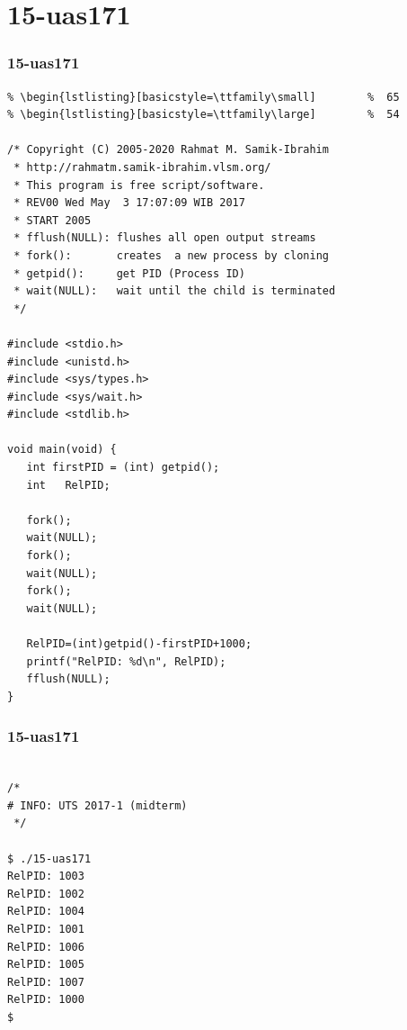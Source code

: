 \documentclass[xcolor=table, notheorems, hyperref={pdfpagelabels=false}]{beamer}
\begin{document}
\section{15-uas171}
\begin{frame}[fragile]
\frametitle{15-uas171}
\begin{lstlisting}[basicstyle=\ttfamily\tiny]         % 108
% \begin{lstlisting}[basicstyle=\ttfamily\footnotesize] %  72
% \begin{lstlisting}[basicstyle=\ttfamily\small]        %  65
% \begin{lstlisting}[basicstyle=\ttfamily\large]        %  54

/* Copyright (C) 2005-2020 Rahmat M. Samik-Ibrahim
 * http://rahmatm.samik-ibrahim.vlsm.org/
 * This program is free script/software. 
 * REV00 Wed May  3 17:07:09 WIB 2017
 * START 2005
 * fflush(NULL): flushes all open output streams
 * fork():       creates  a new process by cloning
 * getpid():     get PID (Process ID)
 * wait(NULL):   wait until the child is terminated
 */

#include <stdio.h>
#include <unistd.h>
#include <sys/types.h>
#include <sys/wait.h>
#include <stdlib.h>

void main(void) {
   int firstPID = (int) getpid();
   int   RelPID;

   fork();
   wait(NULL);
   fork();
   wait(NULL);
   fork();
   wait(NULL);

   RelPID=(int)getpid()-firstPID+1000;
   printf("RelPID: %d\n", RelPID);
   fflush(NULL);
}

\end{lstlisting}
\end{frame}

\begin{frame}[fragile]
\frametitle{15-uas171}
\begin{lstlisting}[basicstyle=\ttfamily\large]        %  54

/*
# INFO: UTS 2017-1 (midterm)
 */

$ ./15-uas171 
RelPID: 1003
RelPID: 1002
RelPID: 1004
RelPID: 1001
RelPID: 1006
RelPID: 1005
RelPID: 1007
RelPID: 1000
$ 


\end{lstlisting}
\end{frame}
\end{document}
